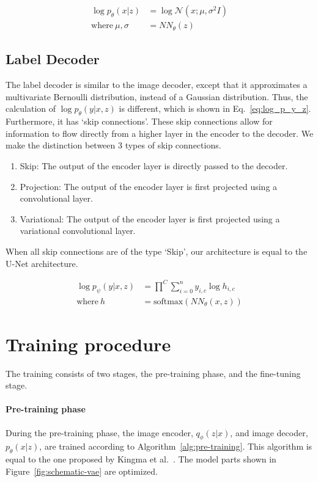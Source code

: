 \begin{equation}
    \begin{split}
        \log p_\theta(x|z)      & = \log \mathcal{N}(x; \mu, \sigma^2I) \label{eq:log_p_x_z} \\
        \text{where}~\mu,\sigma & =NN_\theta(z)
    \end{split}
\end{equation}

\subsection{Label Decoder}
The label decoder is similar to the image decoder, except that it approximates a multivariate Bernoulli distribution, instead of a Gaussian distribution. Thus, the calculation of $\log p_\theta(y|x,z)$ is different, which is shown in Eq.~\ref{eq:log_p_y_z}. Furthermore, it has `skip connections'. These skip connections allow for information to flow directly from a higher layer in the encoder to the decoder. We make the distinction between 3 types of skip connections.
\begin{enumerate}
    \item Skip: The output of the encoder layer is directly passed to the decoder.
    \item Projection: The output of the encoder layer is first projected using a convolutional layer.
    \item Variational: The output of the encoder layer is first projected using a variational convolutional layer.
\end{enumerate}
When all skip connections are of the type `Skip', our architecture is equal to the U-Net architecture.

\begin{subequations}
    \begin{align}
        \log p_\psi(y|x, z) & = \prod^C \sum_{i=0}^n y_{i,c} \log h_{i,c} \label{eq:log_p_y_z} \\
        \text{where}~h      & = \text{softmax}(NN_\theta(x, z))
    \end{align}
\end{subequations}

\section{Training procedure}
The training consists of two stages, the pre-training phase, and the fine-tuning stage. 
\paragraph*{Pre-training phase} During the pre-training phase, the image encoder, $q_\phi(z|x)$, and image decoder, $p_\theta(x|z)$, are trained according to Algorithm~\ref{alg:pre-training}. This algorithm is equal to the one proposed by Kingma et al.~\cite{kingma2014autoencodingvariationalbayes}. The model parts shown in Figure~\ref{fig:schematic-vae} are optimized.


